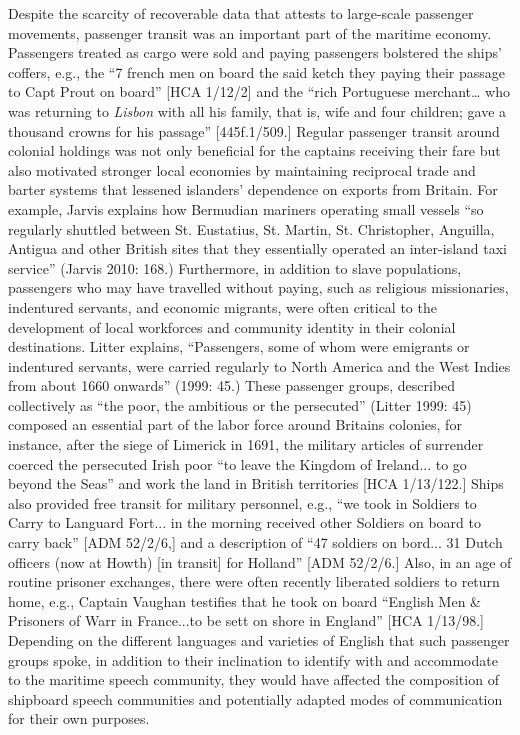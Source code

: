 \documentclass[12pt]{article}
\newenvironment{styleStandard}{\renewcommand\baselinestretch{1.0}\setlength\leftskip{0cm}\setlength\rightskip{0cm plus 1fil}\setlength\parindent{0cm}\setlength\parfillskip{0pt plus 1fil}\setlength\parskip{0in plus 1pt}\writerlistparindent\writerlistleftskip\leavevmode\normalfont\normalsize\writerlistlabel\ignorespaces}{\unskip\vspace{0in plus 1pt}\par}
\newcommand\writerlistleftskip{}
\newcommand\writerlistparindent{}
\newcommand\writerlistlabel{}
\begin{document}
\begin{styleStandard}
Despite the scarcity of recoverable data that attests to large-scale passenger movements, passenger transit was an important part of the maritime economy. Passengers treated as cargo were sold and paying passengers bolstered the ships’ coffers, e.g., the “7 french men on board the said ketch they paying their passage to Capt Prout on board” [HCA 1/12/2] and the “rich Portuguese merchant… who was returning to \textit{Lisbon} with all his family, that is, wife and four children; gave a thousand crowns for his passage” [445f.1/509.] Regular passenger transit around colonial holdings was not only beneficial for the captains receiving their fare but also motivated stronger local economies by maintaining reciprocal trade and barter systems that lessened islanders’ dependence on exports from Britain. For example, Jarvis explains how Bermudian mariners operating small vessels “so regularly shuttled between St. Eustatius, St. Martin, St. Christopher, Anguilla, Antigua and other British sites that they essentially operated an inter-island taxi service” (Jarvis 2010: 168.) Furthermore, in addition to slave populations, passengers who may have travelled without paying, such as religious missionaries, indentured servants, and economic migrants, were often critical to the development of local workforces and community identity in their colonial destinations. Litter explains, “Passengers, some of whom were emigrants or indentured servants, were carried regularly to North America and the West Indies from about 1660 onwards” (1999: 45.) These passenger groups, described collectively as “the poor, the ambitious or the persecuted” (Litter 1999: 45) composed an essential part of the labor force around Britain{\textquotesingle}s colonies, for instance, after the siege of Limerick in 1691, the military articles of surrender coerced the persecuted Irish poor “to leave the Kingdom of Ireland... to go beyond the Seas” and work the land in British territories [HCA 1/13/122.] Ships also provided free transit for military personnel, e.g., “we took in Soldiers to Carry to Languard Fort... in the morning received other Soldiers on board to carry back” [ADM 52/2/6,] and a description of “47 soldiers on bord... 31 Dutch officers (now at Howth) [in transit] for Holland” [ADM 52/2/6.] Also, in an age of routine prisoner exchanges, there were often recently liberated soldiers to return home, e.g., Captain Vaughan testifies that he took on board “English Men \& Prisoners of Warr in France...to be sett on shore in England” [HCA 1/13/98.] Depending on the different languages and varieties of English that such passenger groups spoke, in addition to their inclination to identify with and accommodate to the maritime speech community, they would have affected the composition of shipboard speech communities and potentially adapted modes of communication for their own purposes. 
\end{styleStandard}
\end{document}
